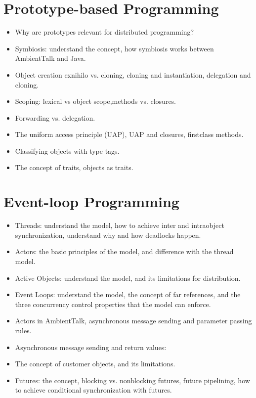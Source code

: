 \documentclass[a4paper]{report}
\begin{document}
\chapter{Prototype-based Programming}
\begin{itemize}
  \item Why are prototypes relevant for distributed programming?
  \item  Symbiosis: understand the concept, how symbiosis works between AmbientTalk and
  Java.
  \item Object creation exnihilo vs. cloning, cloning and instantiation, delegation and cloning.
  \item Scoping: lexical vs object scope,methods vs. closures.
  \item Forwarding vs. delegation.
  \item The uniform access principle (UAP), UAP and closures, firstclass methods.
  \item Classifying objects with type tags.
  \item The concept of traits, objects as traits.
\end{itemize}

\chapter{Event-loop Programming}
\begin{itemize}
  \item Threads: understand the model, how to achieve inter and intraobject synchronization,
  understand why and how deadlocks happen.
  \item Actors: the basic principles of the model, and difference with the thread model.
  \item Active Objects: understand the model, and its limitations for distribution.
  \item Event Loops: understand the model, the concept of far references, and the three
  concurrency control properties that the model can enforce.
  \item Actors in AmbientTalk, asynchronous message sending and parameter passing rules.
  \item Asynchronous message sending and return values:
  \item The concept of customer objects, and its limitations.
  \item Futures: the concept, blocking vs. nonblocking futures, future pipelining, how to
  achieve conditional synchronization with futures.
\end{itemize}
\end{document}
